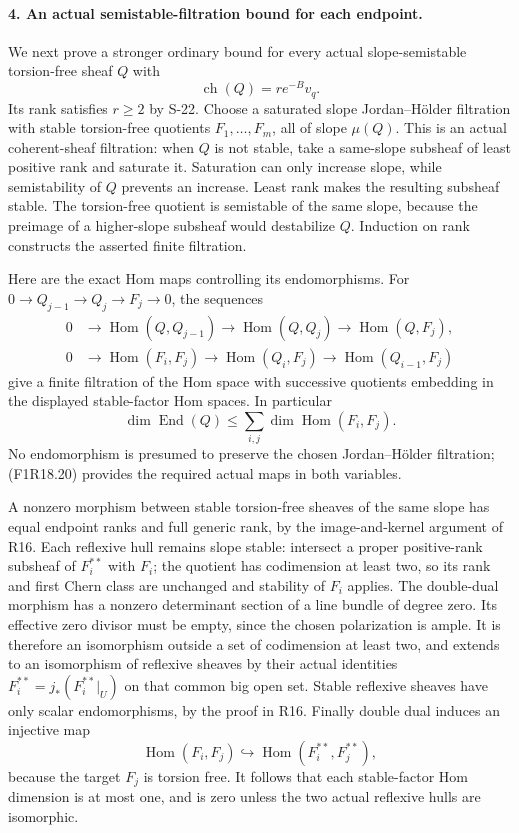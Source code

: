 \paragraph{4. An actual semistable-filtration bound for each endpoint.}
We next prove a stronger ordinary bound for every actual
slope-semistable torsion-free sheaf $Q$ with
\[
                    \operatorname{ch}(Q)=r e^{-B}v_q.
 \tag{F1R18.19}
\]
Its rank satisfies $r\ge2$ by S-22. Choose a saturated
slope Jordan--H\"older filtration with stable torsion-free
quotients $F_1,\ldots,F_m$, all of slope $\mu(Q)$.
This is an actual coherent-sheaf filtration: when $Q$
is not stable, take a same-slope subsheaf of least
positive rank and saturate it. Saturation can only
increase slope, while semistability of $Q$ prevents
an increase. Least rank makes the resulting subsheaf
stable. The torsion-free quotient is semistable of the
same slope, because the preimage of a higher-slope
subsheaf would destabilize $Q$. Induction on rank
constructs the asserted finite filtration.

Here are the exact Hom maps controlling its endomorphisms.
For $0\to Q_{j-1}\to Q_j\to F_j\to0$, the sequences
\[
 \begin{split}
 0&\longrightarrow\operatorname{Hom}(Q,Q_{j-1})
  \longrightarrow\operatorname{Hom}(Q,Q_j)
  \longrightarrow\operatorname{Hom}(Q,F_j),\\
 0&\longrightarrow\operatorname{Hom}(F_i,F_j)
  \longrightarrow\operatorname{Hom}(Q_i,F_j)
  \longrightarrow\operatorname{Hom}(Q_{i-1},F_j)
 \end{split}
 \tag{F1R18.20}
\]
give a finite filtration of the Hom space with successive
quotients embedding in the displayed stable-factor Hom
spaces. In particular
\[
              \dim\operatorname{End}(Q)
                   \le\sum_{i,j}\dim\operatorname{Hom}(F_i,F_j).
 \tag{F1R18.21}
\]
No endomorphism is presumed to preserve the chosen
Jordan--H\"older filtration; (F1R18.20) provides the
required actual maps in both variables.

A nonzero morphism between stable torsion-free sheaves
of the same slope has equal endpoint ranks and full
generic rank, by the image-and-kernel argument of R16.
Each reflexive hull remains slope stable: intersect a
proper positive-rank subsheaf of $F_i^{**}$ with $F_i$;
the quotient has codimension at least two, so its rank
and first Chern class are unchanged and stability of
$F_i$ applies. The double-dual morphism has a nonzero
determinant section of a line bundle of degree zero.
Its effective zero divisor must be empty, since the
chosen polarization is ample. It is therefore an
isomorphism outside a set of codimension at least two,
and extends to an isomorphism of reflexive sheaves by
their actual identities $F_i^{**}=j_*(F_i^{**}|_U)$ on
that common big open set. Stable reflexive sheaves have
only scalar endomorphisms, by the proof in R16. Finally
double dual induces an injective map
\[
 \operatorname{Hom}(F_i,F_j)\hookrightarrow
                   \operatorname{Hom}(F_i^{**},F_j^{**}),
 \tag{F1R18.22}
\]
because the target $F_j$ is torsion free. It follows
that each stable-factor Hom dimension is at most one,
and is zero unless the two actual reflexive hulls are
isomorphic.


